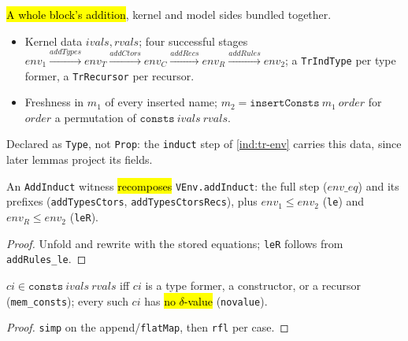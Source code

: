 \begin{definition}
\label{struct:add-induct}
\leanok
{}

 \hl{A whole block's addition}, kernel and model sides bundled together.
\begin{itemize}
\item Kernel data $ivals,rvals$; four successful stages
$env_1 \xrightarrow{addTypes} env_T \xrightarrow{addCtors} env_C \xrightarrow{addRecs}
env_R \xrightarrow{addRules} env_2$; a \texttt{TrIndType} per type former, a
\texttt{TrRecursor} per recursor.
\item Freshness in $m_1$ of every inserted name; $m_2 = \mathtt{insertConsts}\ m_1\ order$
for $order$ a permutation of $\mathtt{consts}\ ivals\ rvals$.
\end{itemize}
 Declared as \texttt{Type}, not \texttt{Prop}: the \texttt{induct} step of
\ref{ind:tr-env} carries this data, since later lemmas project its fields.
\end{definition}

\begin{lemma}
\label{family:add-induct-stages}
\leanok
{}

 An \texttt{AddInduct} witness \hl{recomposes} \texttt{VEnv.addInduct}: the
full step ($env\_eq$) and its prefixes (\texttt{addTypesCtors},
\texttt{addTypesCtorsRecs}), plus $env_1 \le env_2$ (\texttt{le}) and $env_R \le env_2$
(\texttt{leR}).
\end{lemma}
\begin{proof}
\leanok
{} Unfold and rewrite with the stored equations; \texttt{leR} follows from
\texttt{addRules\_le}.
\end{proof}

\begin{lemma}
\label{family:add-induct-membership}
\leanok
{}

 $ci \in \mathtt{consts}\ ivals\ rvals$ iff $ci$ is a type former, a
constructor, or a recursor (\texttt{mem\_consts}); every such $ci$ has \hl{no
$\delta$-value} (\texttt{novalue}).
\end{lemma}
\begin{proof}
\leanok
{} \texttt{simp} on the append/\texttt{flatMap}, then \texttt{rfl} per case.
\end{proof}

